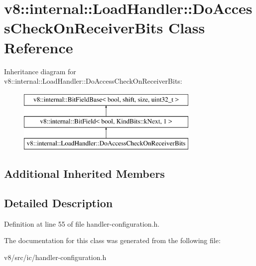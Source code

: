 \hypertarget{classv8_1_1internal_1_1LoadHandler_1_1DoAccessCheckOnReceiverBits}{}\section{v8\+:\+:internal\+:\+:Load\+Handler\+:\+:Do\+Access\+Check\+On\+Receiver\+Bits Class Reference}
\label{classv8_1_1internal_1_1LoadHandler_1_1DoAccessCheckOnReceiverBits}
Inheritance diagram for v8\+:\+:internal\+:\+:Load\+Handler\+:\+:Do\+Access\+Check\+On\+Receiver\+Bits\+:\begin{figure}[H]
\begin{center}
\leavevmode
\includegraphics[height=3.000000cm]{classv8_1_1internal_1_1LoadHandler_1_1DoAccessCheckOnReceiverBits}
\end{center}
\end{figure}
\subsection*{Additional Inherited Members}


\subsection{Detailed Description}


Definition at line 55 of file handler-\/configuration.\+h.



The documentation for this class was generated from the following file\+:\begin{DoxyCompactItemize}
\item 
v8/src/ic/handler-\/configuration.\+h\end{DoxyCompactItemize}
